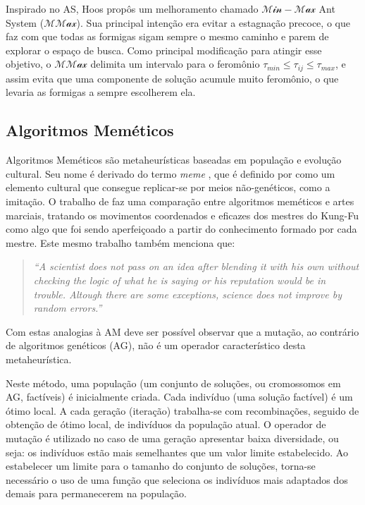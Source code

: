 Inspirado no AS, Hoos \cite{mmas-origin} propôs um melhoramento chamado
$\mathcal{Min-Max}$ Ant System ($\mathcal{MMax}$). Sua principal intenção
era evitar a estagnação precoce, o que faz com que todas as formigas sigam
sempre o mesmo caminho e parem de explorar o espaço de busca. Como principal
modificação para atingir esse objetivo, o $\mathcal{MMax}$ delimita um
intervalo para o feromônio $\tau_{min} \le \tau_{ij} \le \tau_{max}$,
e assim evita que uma componente de solução acumule muito feromônio, %
o que levaria as formigas a sempre escolherem ela.

\subsection{Algoritmos Meméticos}

Algoritmos Meméticos \cite{moscato1} são metaheurísticas baseadas
em população e evolução cultural.
Seu nome é derivado do termo \textit{meme} \cite{dawkins}, que é
definido por \cite{oxford-dict} como um elemento cultural que consegue
replicar-se por meios não-genéticos, como a imitação.
O trabalho de \cite{moscato1} faz uma comparação entre algoritmos
meméticos e artes marciais, tratando os movimentos coordenados e
eficazes dos mestres do Kung-Fu como algo que foi sendo aperfeiçoado
a partir do conhecimento formado por cada mestre. Este mesmo trabalho
também menciona que:
\begin{quote}
\textit{``A scientist does not pass on an idea after blending it with
  his own without checking the logic of what he is saying or his
  reputation would be in trouble. Altough there are some
  exceptions, science does not improve by random errors.''}
\end{quote}
Com estas analogias à AM deve ser possível observar que a mutação, ao
contrário de algoritmos genéticos (AG), não é um operador
característico desta metaheurística.

Neste método, uma população (um conjunto de soluções, ou cromossomos
em AG, factíveis) é
inicialmente criada. Cada indivíduo (uma solução factível) é um ótimo
local. A cada geração (iteração) trabalha-se com recombinações,
seguido de obtenção de ótimo local, de indivíduos da população
atual. O operador de mutação é utilizado no caso de uma
geração apresentar baixa diversidade, ou seja: os indivíduos estão
mais semelhantes que um valor limite estabelecido.
Ao estabelecer um limite para o tamanho do conjunto de soluções,
torna-se necessário o uso de uma função que seleciona os indivíduos
mais adaptados dos demais para permanecerem na população.


